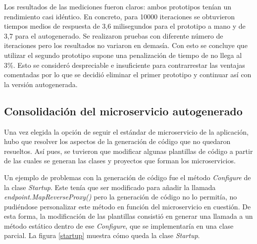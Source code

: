 \documentclass[11pt,spanish,listoffigures]{tfgetsinf}
\begin{document}
Los resultados de las mediciones fueron claros: ambos prototipos tenían un rendimiento casi idéntico.
En concreto, para 10000 iteraciones se obtuvieron tiempos medios de respuesta de 3,6 milisegundos para el prototipo a mano y de 3,7 para el autogenerado. Se realizaron pruebas con diferente número de iteraciones pero los resultados no variaron en demasía. Con esto se concluye que utilizar el segundo prototipo supone una penalización de tiempo de no llega al 3\%. Esto se consideró despreciable e insuficiente para contrarrestar las ventajas comentadas por lo que se decidió eliminar el primer prototipo y continuar así con la versión autogenerada.


		\subsection{Consolidación del microservicio autogenerado}

Una vez elegida la opción de seguir el estándar de microservicio de la aplicación, hubo que resolver los aspectos de la generación de código que no quedaron resueltos. Así pues, se tuvieron que modificar algunas plantillas de código a partir de las cuales se generan las clases y proyectos que forman los microservicios.

Un ejemplo de problemas con la generación de código fue el método \emph{Configure} de la clase \emph{Startup}. Este tenía que ser modificado para añadir la llamada \emph{endpoint.MapReverseProxy()} pero la generación de código no lo permitía, no pudiéndose personalizar este método en función del microservicio en cuestión. De esta forma, la modificación de las plantillas consistió en generar una llamada a un método estático dentro de ese \emph{Configure}, que se implementaría en una clase parcial. La figura \ref{startup} muestra cómo queda la clase \emph{Startup}.
\end{document}
